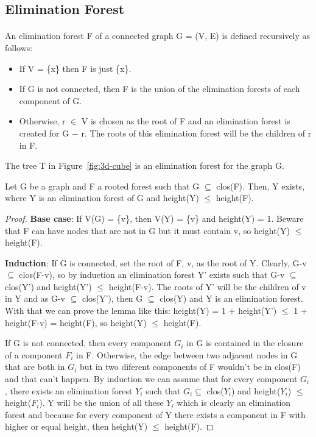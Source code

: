 \subsection{Elimination Forest}
\paragraph{}
An elimination forest F of a connected graph G = (V, E) is defined recursively as follows:
\begin{itemize}
  \item If V = \{x\} then F is just \{x\}.
  \item If G is not connected, then F is the union of the elimination forests of each component of G.
  \item Otherwise, r $\in$ V is chosen as the root of F and an elimination forest is created for G $-$ r. The roots of this elimination forest will be the children of r in F.
\end{itemize}
The tree T in Figure~\ref{fig:3d-cube} is an elimination forest for the graph G.

\begin{lemma}
\label{lema:min-ET}
Let G be a graph and F a rooted forest such that G $\subseteq$ clos(F). Then, Y exists, where Y is an elimination forest of G and height(Y) $\leq$ height(F).
\end{lemma}

\begin{proof}
  \item \textbf{Base case}: If V(G) = \{v\}, then V(Y) = \{v\} and height(Y) = 1. Beware that F can have nodes that are not in G but it must contain v, so height(Y) $\leq$ height(F).
  \item \textbf{Induction}: If G is connected, set the root of F, v, as the root of Y. Clearly, G-v $\subseteq$ clos(F-v), so by induction an elimination forest Y' exists such that G-v $\subseteq$ clos(Y') and height(Y') $\leq$ height(F-v). The roots of Y' will be the children of v in Y and as G-v $\subseteq$ clos(Y'), then G $\subseteq$ clos(Y) and Y is an elimination forest. With that we can prove the lemma like this: height(Y) = 1 + height(Y') $\leq$ 1 + height(F-v) = height(F), so height(Y) $\leq$ height(F).
  
  If G is not connected, then every component $G_i$ in G is contained in the closure of a component $F_i$ in F. Otherwise, the edge between two adjacent nodes in G that are both in $G_i$ but in two diferent components of F wouldn't be in clos(F) and that can't happen. By induction we can assume that for every component $G_i$, there exists an elimination forest $Y_i$ such that $G_i \subseteq$ clos($Y_i$) and height($Y_i$) $\leq$ height($F_i$). Y will be the union of all these $Y_i$ which is clearly an elimination forest and because for every component of Y there exists a component in F with higher or equal height, then height(Y) $\leq$ height(F).
\end{proof}

